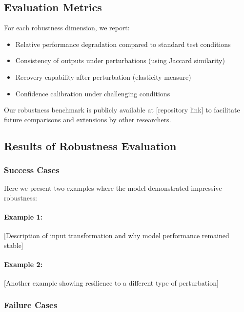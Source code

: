 \documentclass[11pt,a4paper]{article}
\begin{document}
\subsection{Evaluation Metrics}

For each robustness dimension, we report:
\begin{itemize}
    \item Relative performance degradation compared to standard test conditions
    \item Consistency of outputs under perturbations (using Jaccard similarity)
    \item Recovery capability after perturbation (elasticity measure)
    \item Confidence calibration under challenging conditions
\end{itemize}

Our robustness benchmark is publicly available at [repository link] to facilitate future comparisons and extensions by other researchers.

\subsection{Results of Robustness Evaluation}


\subsubsection{Success Cases}

Here we present two examples where the model demonstrated impressive robustness:

\paragraph{Example 1:} [Description of input transformation and why model performance remained stable]

\paragraph{Example 2:} [Another example showing resilience to a different type of perturbation]

\subsubsection{Failure Cases}
\end{document}
